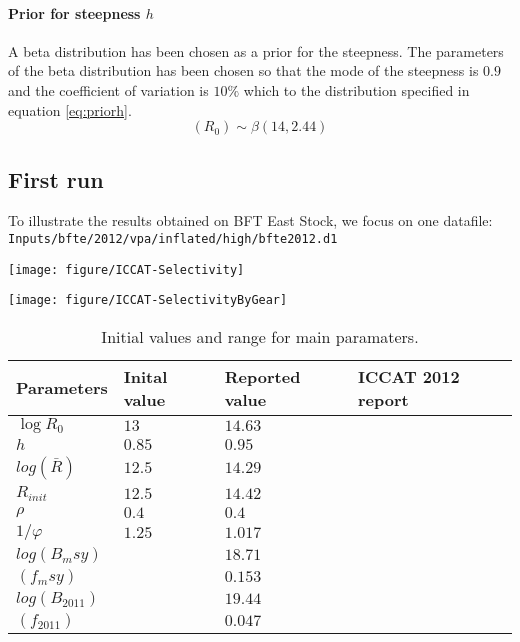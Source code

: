 \paragraph{Prior for steepness $h$}
A beta distribution has been chosen as a prior for the steepness. The parameters of the beta distribution has been chosen so that the mode of the steepness is $0.9$ and the coefficient of variation is 
$10\%$ which to the distribution specified in equation \ref{eq:priorh}.
\begin{equation}
(R_0) \sim \beta\left(14, 2.44\right)
\label{eq:priorh}
\end{equation}



\subsection{First run}
To illustrate the results obtained on BFT East Stock, we focus on one datafile: \verb+Inputs/bfte/2012/vpa/inflated/high/bfte2012.d1+


{\centering \texttt{[image: figure/ICCAT-Selectivity]} 

}



{\centering \texttt{[image: figure/ICCAT-SelectivityByGear]} 
}


\begin{table}[ht]
\centering
\begin{tabular}{p{2.1cm}p{4cm}p{4cm}p{4cm}}
  \hline
Parameters & Inital value & Reported value & ICCAT 2012  report  \\ \hline
 $\log{R_0}$ & $13$  &  $14.63$ & \\
 $h$ & $0.85$ & $0.95$  &\\
$log(\bar{R})$& $12.5$ & $14.29$ \\
$R_{init}$ & $12.5$ & $14.42$\\
$\rho$ & $0.4$ &  $0.4$ & 	\\
$1/\varphi$ & $1.25$ & $1.017$ &\\
$log(B_msy)$ &  &$18.71$ & \\
$(f_msy)$ &  &$0.153$ & \\
$log(B_{2011})$ &  &$19.44$ & \\
$(f_{2011})$ &   &$0.047$ & \\
\hline
\end{tabular}
\caption{Initial values and range for main paramaters.}
\label{table:estimation}
\end{table}



